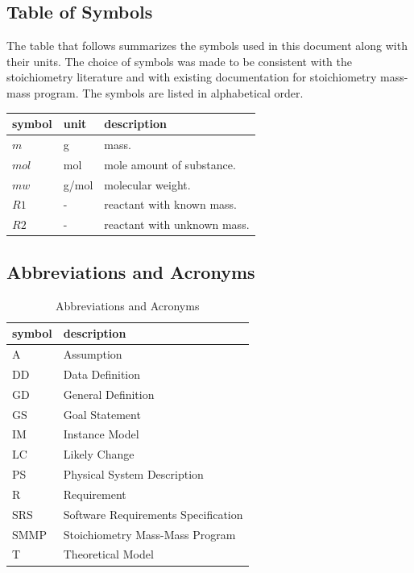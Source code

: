 \documentclass[12pt]{article}
\begin{document}
\subsection{Table of Symbols}

The table that follows summarizes the symbols used in this document along with
their units. The choice of symbols was made to be consistent with the
stoichiometry literature and with existing documentation for stoichiometry
mass-mass program. The symbols are listed in alphabetical order.

\renewcommand{\arraystretch}{1.2}
\noindent \begin{longtable*}{l l p{12cm}} \toprule
\endlastfoot
\textbf{symbol} & \textbf{unit} & \textbf{description}\\
\midrule 
$m$ & \si[per-mode=symbol] {\gram} & mass.\\
$mol$ & \si[per-mode=symbol] {\mol} & mole amount of substance.\\ 
$mw$ & \si[per-mode=symbol] {\gram/\mol} & molecular weight.\\ 
$R1$ & \si[per-mode=symbol] {-} & reactant with known mass.\\
 $R2$ & \si[per-mode=symbol] {-} & reactant with unknown mass.\\ 


\bottomrule
\end{longtable*}

\subsection{Abbreviations and Acronyms}

\renewcommand{\arraystretch}{1.2}
\begin{table}[ht]
\begin{tabular}{l l} 
  \toprule		
  \textbf{symbol} & \textbf{description}\\
  \midrule 
  A & Assumption\\
  DD & Data Definition\\
  GD & General Definition\\
  GS & Goal Statement\\
  IM & Instance Model\\
  LC & Likely Change\\
  PS & Physical System Description\\
  R & Requirement\\
  SRS & Software Requirements Specification\\
 SMMP & Stoichiometry Mass-Mass Program\\
  T & Theoretical Model\\
  \bottomrule
  \end{tabular}
  \caption{ Abbreviations and Acronyms}
 \end{table}
\end{document}
